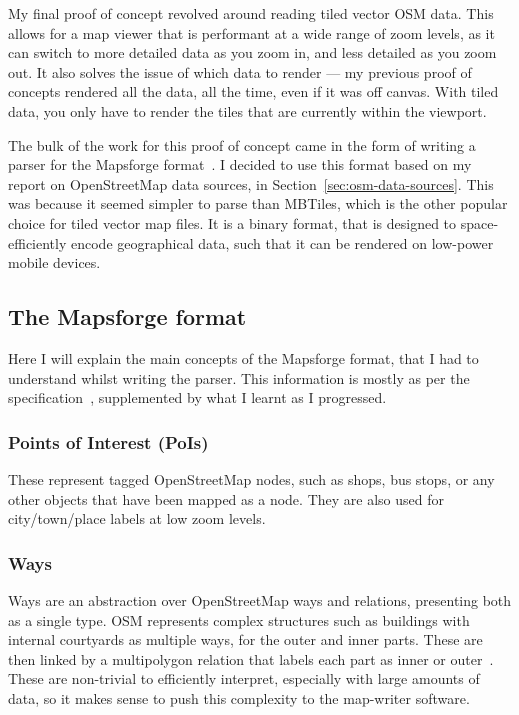 \documentclass{final_report}
\begin{document}
My final proof of concept revolved around reading tiled vector OSM data. This allows for a map viewer that is performant at a wide range of zoom levels, as it can switch to more detailed data as you zoom in, and less detailed as you zoom out. It also solves the issue of which data to render --- my previous proof of concepts rendered all the data, all the time, even if it was off canvas. With tiled data, you only have to render the tiles that are currently within the viewport.

The bulk of the work for this proof of concept came in the form of writing a parser for the Mapsforge format~\cite{mapsforge-format}. I decided to use this format based on my report on OpenStreetMap data sources, in Section~\ref{sec:osm-data-sources}. This was because it seemed simpler to parse than MBTiles, which is the other popular choice for tiled vector map files. It is a binary format, that is designed to space-efficiently encode geographical data, such that it can be rendered on low-power mobile devices.

\subsection{The Mapsforge format}

Here I will explain the main concepts of the Mapsforge format, that I had to understand whilst writing the parser. This information is mostly as per the specification~\cite{mapsforge-format}, supplemented by what I learnt as I progressed.

\subsubsection{Points of Interest (PoIs)}

These represent tagged OpenStreetMap nodes, such as shops, bus stops, or any other objects that have been mapped as a node. They are also used for city/town/place labels at low zoom levels.

\subsubsection{Ways}

Ways are an abstraction over OpenStreetMap ways and relations, presenting both as a single type. OSM represents complex structures such as buildings with internal courtyards as multiple ways, for the outer and inner parts. These are then linked by a multipolygon relation that labels each part as inner or outer~\cite{osm-wiki-multipolygon}. These are non-trivial to efficiently interpret, especially with large amounts of data, so it makes sense to push this complexity to the map-writer software.
\end{document}
